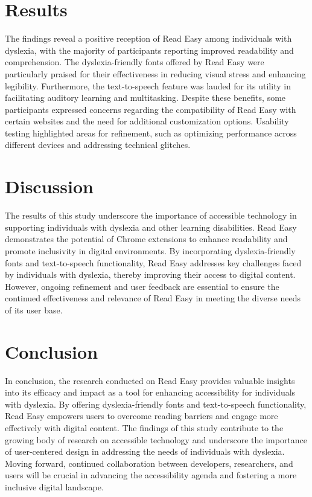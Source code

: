 \documentclass{article}
\begin{document}
\section{Results}
The findings reveal a positive reception of Read Easy among individuals with dyslexia, with the majority of participants reporting improved readability and comprehension. The dyslexia-friendly fonts offered by Read Easy were particularly praised for their effectiveness in reducing visual stress and enhancing legibility. Furthermore, the text-to-speech feature was lauded for its utility in facilitating auditory learning and multitasking. Despite these benefits, some participants expressed concerns regarding the compatibility of Read Easy with certain websites and the need for additional customization options. Usability testing highlighted areas for refinement, such as optimizing performance across different devices and addressing technical glitches.

\section{Discussion}
The results of this study underscore the importance of accessible technology in supporting individuals with dyslexia and other learning disabilities. Read Easy demonstrates the potential of Chrome extensions to enhance readability and promote inclusivity in digital environments. By incorporating dyslexia-friendly fonts and text-to-speech functionality, Read Easy addresses key challenges faced by individuals with dyslexia, thereby improving their access to digital content. However, ongoing refinement and user feedback are essential to ensure the continued effectiveness and relevance of Read Easy in meeting the diverse needs of its user base.

\section{Conclusion}
In conclusion, the research conducted on Read Easy provides valuable insights into its efficacy and impact as a tool for enhancing accessibility for individuals with dyslexia. By offering dyslexia-friendly fonts and text-to-speech functionality, Read Easy empowers users to overcome reading barriers and engage more effectively with digital content. The findings of this study contribute to the growing body of research on accessible technology and underscore the importance of user-centered design in addressing the needs of individuals with dyslexia. Moving forward, continued collaboration between developers, researchers, and users will be crucial in advancing the accessibility agenda and fostering a more inclusive digital landscape.
\end{document}
